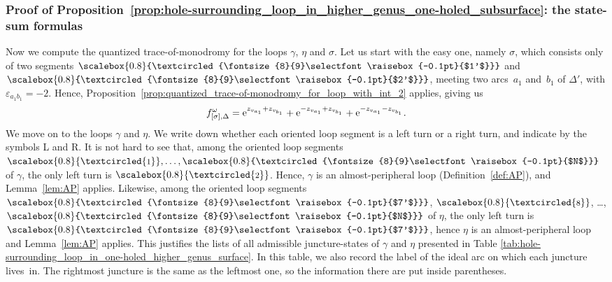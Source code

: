 \documentclass[10pt,a4paper]{amsart}
\numberwithin{equation}{section}
\theoremstyle{definition}
\newcommand{\circled}[1]{\scalebox{0.8}{\textcircled{\fontsize{8}{9}\selectfont \raisebox{-0.1pt}{#1}}}}
\begin{document}
\subsubsection{Proof of Proposition~\ref{prop:hole-surrounding_loop_in_higher_genus_one-holed_subsurface}: the state-sum formulas}
Now we compute the quantized trace-of-monodromy for the loops $\gamma$, $\eta$ and $\sigma$. Let us start with the easy one, namely $\sigma$, which consists only of two segments $\circled{$1'$}$ and $\circled{$2'$}$, meeting two arcs~$a_1$ and~$b_1$ of $\Delta'$, with $\varepsilon_{a_1b_1} = -2$. Hence, Proposition~\ref{prop:quantized_trace-of-monodromy_for_loop_with_int_2} applies, giving us\vspace{-1mm}
\begin{align}
\label{eq:ohs_proof_f_omega_sigma}
f^\omega_{[\sigma],\Delta} = {\rm e}^{z_{v_{a_1}} + z_{v_{b_1}}} + {\rm e}^{-z_{v_{a_1}} + z_{v_{b_1}}} + {\rm e}^{-z_{v_{a_1}}-z_{v_{b_1}}}.\vspace{-1mm}
\end{align}
We move on to the loops $\gamma$ and $\eta$. We write down whether each oriented loop segment is a left turn or a right turn, and indicate by the symbols L and R. It is not hard to see that, among the oriented loop segments $\circled{1},\dots,\circled{$N$}$ of $\gamma$, the only left turn is $\circled{2}$. Hence, $\gamma$ is an almost-peripheral loop (Definition~\ref{def:AP}), and Lemma~\ref{lem:AP} applies. Likewise, among the oriented loop segments $\circled{$7'$}$, $\circled{8}$, \dots, $\circled{$N$}$ of $\eta$, the only left turn is $\circled{$7'$}$, hence $\eta$ is an almost-peripheral loop and Lemma~\ref{lem:AP} applies. This justifies the lists of all admissible juncture-states of $\gamma$ and $\eta$ presented in Table \ref{tab:hole-surrounding_loop_in_one-holed_higher_genus_surface}. In this table, we also record the label of the ideal arc on which each juncture lives~in. The rightmost juncture is the same as the leftmost one, so the information there are put inside parentheses.
\end{document}
